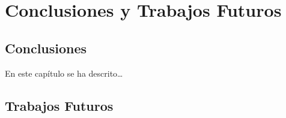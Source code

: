 \chapter{Conclusiones y Trabajos Futuros}
\label{cap:conclusiones}


\section{Conclusiones}
En este capítulo se ha descrito\ldots

\section{Trabajos Futuros}